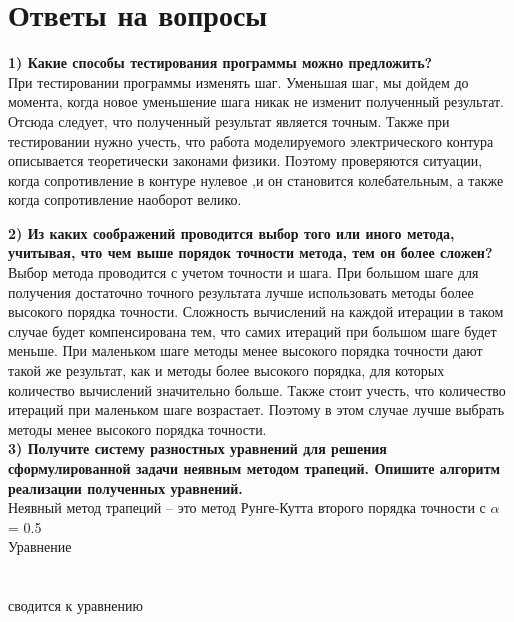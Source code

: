 \documentclass[a4paper, 12pt]{article}
\begin{document}
\section{Ответы на вопросы}
\textbf{1) Какие способы тестирования программы можно предложить?}
\\При тестировании программы изменять шаг.  Уменьшая шаг, мы дойдем до момента, когда новое уменьшение шага никак не изменит полученный результат. Отсюда следует, что полученный результат является точным. 
Также при тестировании нужно учесть, что работа моделируемого электрического контура описывается теоретически законами физики. Поэтому проверяются ситуации, когда сопротивление в контуре нулевое ,и он становится колебательным, а также когда сопротивление наоборот велико.

\textbf{2) Из каких соображений проводится выбор того или иного метода, учитывая, что чем выше порядок точности метода, тем он более сложен?}
\\ Выбор метода проводится с учетом точности и шага. При большом шаге для получения достаточно точного результата лучше использовать методы более высокого порядка точности. Сложность вычислений на каждой итерации в таком случае будет компенсирована тем, что самих итераций при большом шаге будет меньше. При маленьком шаге методы менее высокого порядка точности дают такой же результат, как и методы более высокого порядка, для которых количество вычислений значительно больше. Также стоит учесть, что количество итераций при маленьком шаге возрастает. Поэтому в этом случае лучше выбрать методы менее высокого порядка точности.
\\ \textbf{3) Получите систему разностных уравнений для решения сформулированной задачи неявным методом трапеций. Опишите  алгоритм реализации полученных уравнений.}
\\Неявный метод трапеций – это метод Рунге-Кутта второго порядка точности с $\alpha$ = 0.5
\\  Уравнение \\ 
\\ \\сводится к уравнению 
\end{document}
